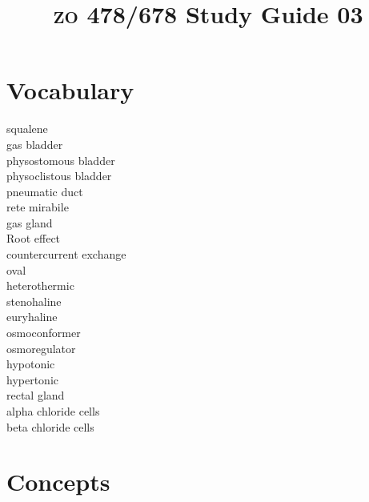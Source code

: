 \documentclass[letterpaper]{tufte-handout}
\title{{\scshape zo} 478/678 Study Guide 03}
\date{} %
\begin{document}
\maketitle	%


\section{Vocabulary} 
\vspace{-1\baselineskip}
\begin{multicols}{2}
squalene \\
gas bladder \\
physostomous bladder \\
physoclistous bladder \\
pneumatic duct \\
rete mirabile \\
gas gland \\
Root effect \\
countercurrent exchange \\
oval \\
heterothermic \\
stenohaline \\
euryhaline \\
osmoconformer \\
osmoregulator \\
hypotonic \\
hypertonic \\
rectal gland \\
alpha chloride cells \\
beta chloride cells
\end{multicols}

\section{Concepts}
\end{document}
